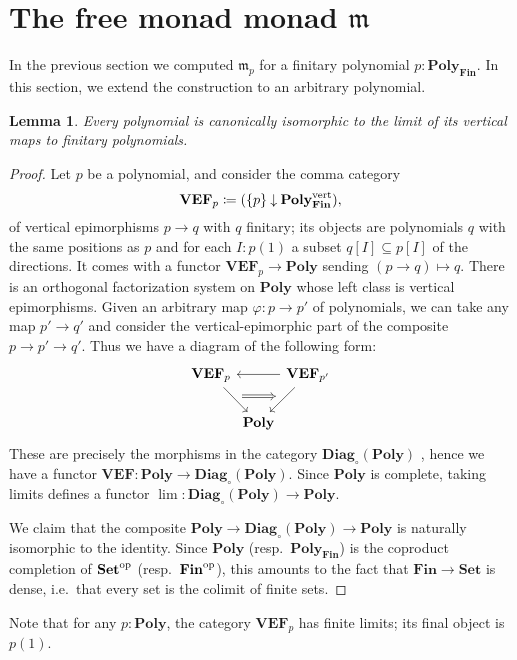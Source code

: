 \documentclass[11pt, one side, article]{memoir}
\theoremstyle{definition}
\theoremstyle{plain}
\newtheorem{lemma}[definitionx]{Lemma}
\renewcommand{\ss}{\subseteq}
\newcommand{\Cat}[1]{\mathbf{#1}}%
\newcommand{\down}{\mathbin{\downarrow}}
\newcommand{\op}{^\tn{op}}
\newcommand{\tn}[1]{\textnormal{#1}}
\newcommand{\finset}{\Cat{Fin}}
\newcommand{\smset}{\Cat{Set}}
\newcommand{\polyfin}{\poly_{\finset}}
\newcommand{\poly}{\Cat{Poly}}
\newcommand{\free}{\mathfrak{m}}
\newcommand{\diag}{\Cat{Diag}}
\newcommand{\VEF}{\Cat{VEF}}
\begin{document}
\section{The free monad monad $\free$}

In the previous section we computed $\free_p$ for a finitary polynomial $p:\polyfin$. In this section, we extend the construction to an arbitrary polynomial.

\begin{lemma}\label{lemma.vert_lim}
Every polynomial is canonically isomorphic to the limit of its vertical maps to finitary polynomials.
\end{lemma}
\begin{proof}
Let $p$ be a polynomial, and consider the comma category
\[\VEF_p\coloneqq(\{p\}\down\polyfin^\tn{vert}),\]
of vertical epimorphisms $p\to q$ with $q$ finitary; its objects are polynomials $q$ with the same positions as $p$ and for each $I:p(1)$ a subset $q[I]\ss p[I]$ of the directions. It comes with a functor $\VEF_p\to\poly$ sending $(p\to q)\mapsto q$. There is an orthogonal factorization system on $\poly$ whose left class is vertical epimorphisms. Given an arbitrary map $\varphi\colon p\to p'$ of polynomials, we can take any map $p'\to q'$ and consider the vertical-epimorphic part of the composite $p\to p'\to q'$. Thus we have a diagram of the following form:
\[
\begin{tikzcd}[column sep=0pt]
	\VEF_p\ar[dr, "" name=p]&&\VEF_{p'}\ar[dl, ""' name=p']\ar[ll]\\&
	\poly
	\ar[from=p, to=p', Rightarrow]
\end{tikzcd}
\]
These are precisely the morphisms in the category $\diag_\circ(\poly)$ \cite{peschke2021diagrams}, hence we have a functor $\VEF\colon\poly\to\diag_\circ(\poly)$. Since $\poly$ is complete, taking limits defines a functor $\lim\colon\diag_\circ(\poly)\to\poly$. 

We claim that the composite $\poly\to\diag_\circ(\poly)\to\poly$ is naturally isomorphic to the identity. Since $\poly$ (resp.\ $\polyfin$) is the coproduct completion of $\smset\op$ (resp.\ $\finset\op$), this amounts to the fact that $\finset\to\smset$ is dense, i.e.\ that every set is the colimit of finite sets. 
\end{proof}

Note that for any $p:\poly$, the category $\VEF_p$ has finite limits; its final object is $p(1)$.
\end{document}

